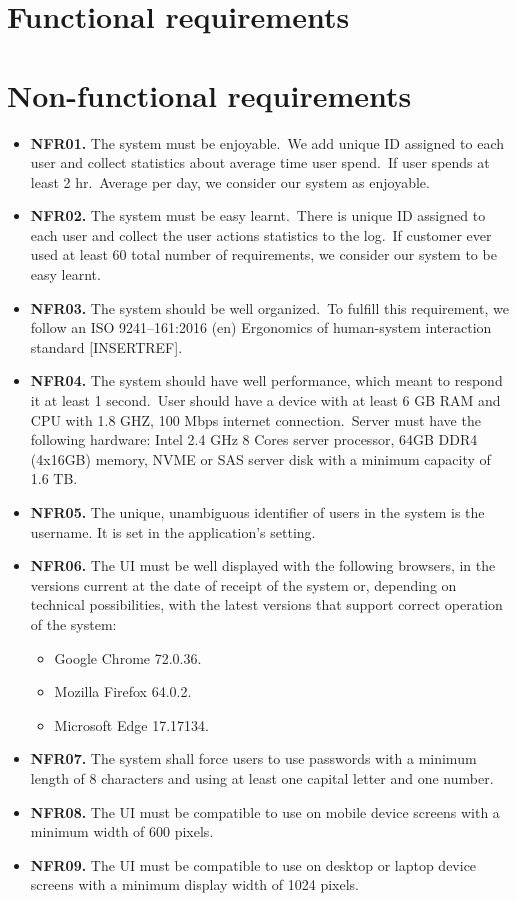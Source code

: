 \section{Functional requirements}\label{sec:functional-requirements}


\section{Non-functional requirements}\label{sec:non-functional-requirements}
\begin{itemize}
    \item \textbf{NFR01.} The system must be enjoyable.\ We add unique ID assigned to each user and
    collect statistics about average time user spend.\ If user spends at least 2 hr.\ Average
    per day, we consider our system as enjoyable.
    \item \textbf{NFR02.} The system must be easy learnt.\ There is unique ID assigned to each user and
    collect the user actions statistics to the log.\ If customer ever used at least 60%
    total number of requirements, we consider our system to be easy learnt.
    \item \textbf{NFR03.} The system should be well organized.\ To fulfill this requirement, we follow an
    ISO 9241--161:2016 (en) Ergonomics of human-system interaction standard [INSERTREF].
    \item \textbf{NFR04.} The system should have well performance, which meant to respond it at
    least 1 second.\ User should have a device with at least 6 GB RAM and CPU with 1.8
    GHZ, 100 Mbps internet connection.\ Server must have the following hardware: Intel
    2.4 GHz 8 Cores server processor, 64GB DDR4 (4x16GB) memory, NVME or SAS
    server disk with a minimum capacity of 1.6 TB\@.
    \item \textbf{NFR05.} The unique, unambiguous identifier of users in the system is the username.
    It is set in the application’s setting.
    \item \textbf{NFR06.} The UI must be well displayed with the following browsers, in the versions
    current at the date of receipt of the system or, depending on technical possibilities,
    with the latest versions that support correct operation of the system:
    \begin{itemize}
        \item Google Chrome 72.0.36.
        \item Mozilla Firefox 64.0.2.
        \item Microsoft Edge 17.17134.
    \end{itemize}
    \item \textbf{NFR07.} The system shall force users to use passwords with a minimum length of 8
    characters and using at least one capital letter and one number.
    \item \textbf{NFR08.} The UI must be compatible to use on mobile device screens with a minimum
    width of 600 pixels.
    \item \textbf{NFR09.} The UI must be compatible to use on desktop or laptop device screens with a
    minimum display width of 1024 pixels.
\end{itemize}
